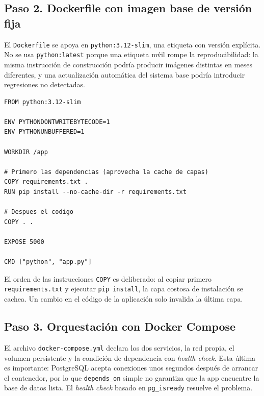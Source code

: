 \documentclass[12pt,a4paper]{article}
\begin{document}
\subsection{Paso 2. Dockerfile con imagen base de versi\'on fija}

El \texttt{Dockerfile} se apoya en \texttt{python:3.12-slim}, una etiqueta con versi\'on
expl\'icita. No se usa \texttt{python:latest} porque una etiqueta m\'vil rompe la
reproducibilidad: la misma instrucci\'on de construcci\'on podr\'ia producir im\'agenes
distintas en meses diferentes, y una actualizaci\'on autom\'atica del sistema base podr\'ia
introducir regresiones no detectadas.

\begin{lstlisting}[caption=Contenido de app/Dockerfile]
FROM python:3.12-slim

ENV PYTHONDONTWRITEBYTECODE=1
ENV PYTHONUNBUFFERED=1

WORKDIR /app

# Primero las dependencias (aprovecha la cache de capas)
COPY requirements.txt .
RUN pip install --no-cache-dir -r requirements.txt

# Despues el codigo
COPY . .

EXPOSE 5000

CMD ["python", "app.py"]
\end{lstlisting}

El orden de las instrucciones \texttt{COPY} es deliberado: al copiar primero
\texttt{requirements.txt} y ejecutar \texttt{pip install}, la capa costosa de instalaci\'on
se cachea. Un cambio en el c\'odigo de la aplicaci\'on solo invalida la \'ultima capa.

\subsection{Paso 3. Orquestaci\'on con Docker Compose}

El archivo \texttt{docker-compose.yml} declara los dos servicios, la red propia, el volumen
persistente y la condici\'on de dependencia con \emph{health check}. Esta \'ultima es
importante: PostgreSQL acepta conexiones unos segundos despu\'es de arrancar el
contenedor, por lo que \texttt{depends\_on} simple no garantiza que la app encuentre la base
de datos lista. El \emph{health check} basado en \texttt{pg\_isready} resuelve el problema.
\end{document}
